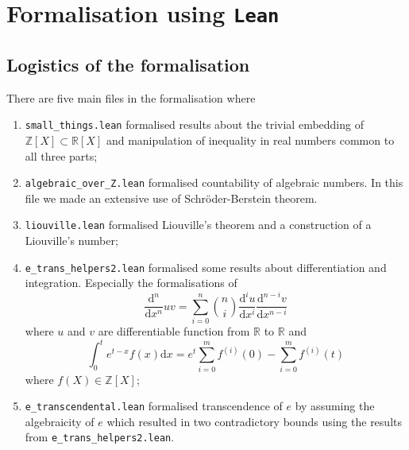 \documentclass{report}
\theoremstyle{definition}
\theoremstyle{plain}
\begin{document}
\chapter{Formalisation using {\tt Lean}}\label{fmlsn}


\section*{Logistics of the formalisation}
There are five main files in the formalisation where 
\begin{enumerate}
\item {\tt small\_things.lean} formalised results about the trivial embedding of $\mathbb Z[X]\subset \mathbb R[X]$ and manipulation of inequality in real numbers common to all three parts;
\item {\tt algebraic\_over\_Z.lean} formalised countability of algebraic numbers. In this file we made an extensive use of Schröder-Berstein theorem.
\item {\tt liouville.lean} formalised Liouville's theorem and a construction of a Liouville's number;
\item {\tt e\_trans\_helpers2.lean} formalised some results about differentiation and integration. Especially the formalisations of 
$$
\frac{\mathrm d^n}{\mathrm d x^n}uv = \sum_{i=0}^n{n \choose i}\frac{\mathrm d^i u}{\mathrm d x^i}\frac{\mathrm d^{n-i} v}{\mathrm d x^{n-i}}
$$ where $u$ and $v$ are differentiable function from $\mathbb R$ to $\mathbb R$ and
$$
\int_0^t e^{t-x}f(x)\mathrm{d}x=e^t\sum_{i=0}^m f^{(i)}(0)-\sum_{i=0}^m f^{(i)}(t)
$$ where $f(X)\in\mathbb Z[X]$;
\item {\tt e\_transcendental.lean} formalised transcendence of $e$ by assuming the algebraicity of $e$ which resulted in two contradictory bounds using the results from {\tt e\_trans\_helpers2.lean}.
\end{enumerate}
\end{document}
